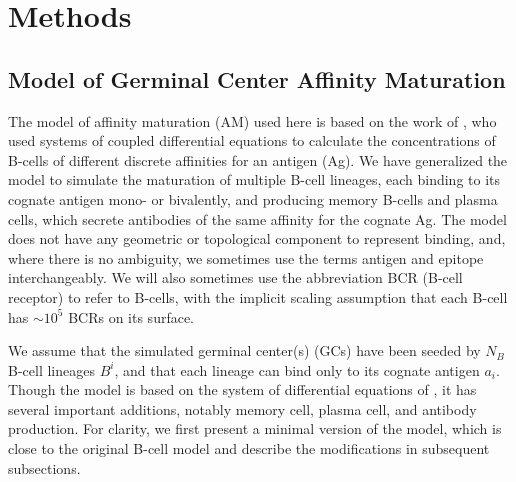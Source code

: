 \documentclass[utf8]{frontiersHLTH}%
\newcommand{\vo}[1]{#1} %
\newcommand{\fig}[1]{Fig.~\ref{fig:#1}}
\newcommand{\hide}[1]{}
\begin{document}
\section{Methods}
\label{sec:methods}

\subsection*{Model of Germinal Center Affinity Maturation}

The model of affinity maturation (AM) used here is based on the work of
\citet{kepler93},
who used systems of coupled
differential equations to calculate the concentrations of B-cells of
different discrete affinities for an antigen (Ag). %
We have generalized the model to
simulate the maturation of multiple B-cell lineages, each binding to its cognate
antigen mono- or bivalently, and producing memory B-cells and plasma
cells, which secrete antibodies of the same affinity for the cognate Ag. The model does not have any
geometric or topological component to represent binding, and, where there is no ambiguity, we sometimes use
the terms antigen and epitope interchangeably. We will also sometimes use
the abbreviation BCR (B-cell receptor) to refer to B-cells, with the implicit
scaling assumption that each B-cell has $\sim10^5$ BCRs on its surface.\cite{casten88,Alberts02}

We assume that the simulated germinal center(s) (GCs) have been seeded by
$N_B$ B-cell lineages $B^i$, and that each lineage can bind only to its cognate
antigen $a_i$. Though the model is based on the system of differential equations
of \citet{kepler93}, it has several important additions, \vo{notably}
memory cell, plasma cell, and antibody production. For clarity, we first present
a minimal version of the model, which is close to the original B-cell model\cite{kepler93} and describe the modifications in
subsequent subsections.
\hide{A visual schematic of the model components was given in \fig{model}.}
\end{document}
